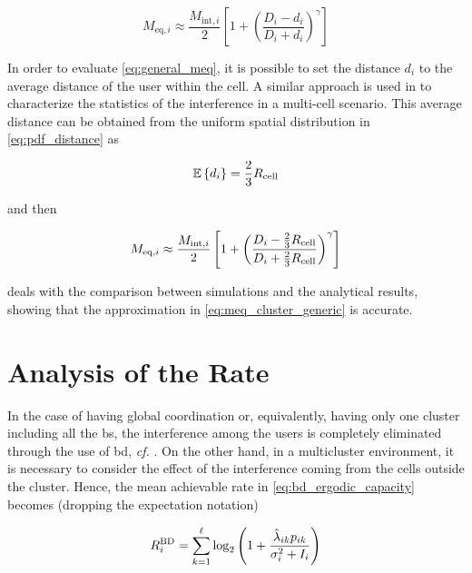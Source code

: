 \begin{equation} \label{eq:general_meq}
    M_{\text{eq}, i} \approx \frac{M_{\text{int}, i}}{2} \left[ 1 + \left(
    \frac{D_i - d_i}{D_i + d_i}\right)^\gamma\right]
\end{equation}

In order to evaluate \eqref{eq:general_meq}, it is possible to set the distance
$d_i$ to the average distance of the user within the cell. A similar approach is
used in \cite{pijcke11} to characterize the statistics of the interference in a
multi-cell scenario. This average distance can be obtained from the uniform
spatial distribution in \eqref{eq:pdf_distance} as

\begin{equation} \label{eq:average_distance}
    \mathbb{E}\left\{d_i\right\} = \frac{2}{3}R_{\text{cell}}
\end{equation}

\noindent
and then

\begin{equation} \label{eq:meq_cluster_generic}
    M_{\text{eq}, i} \approx \frac{M_{\text{int},i}}{2} \left[ 1 + \left(
        \frac{D_i - \frac{2}{3}R_{\text{cell}}}
        {D_i + \frac{2}{3}R_{\text{cell}}}\right)^\gamma\right]
\end{equation}

 deals with the comparison between simulations and
the analytical results, showing that the approximation in
\eqref{eq:meq_cluster_generic} is accurate.


\section{Analysis of the Rate}\label{sec:achiev_rate_analysis}

In the case of having global coordination or, equivalently, having only one
cluster including all the \gls{bs}, the interference among the users is
completely eliminated through the use of \gls{bd}, \emph{cf.} . On
the other hand, in a multicluster environment, it is necessary to consider the
effect of the interference coming from the cells outside the cluster. Hence, the
mean achievable rate in \eqref{eq:bd_ergodic_capacity} becomes (dropping the
expectation notation)

\begin{equation} \label{eq:rate_bd_interf}
    R_i^{\text{BD}} = \sum\limits_{k = 1}^{\ell} \log_2 \left(1 +
        \frac{\hat{\lambda}_{ik} p_{ik}}{\sigma_i^2 + I_i} \right)
\end{equation}

